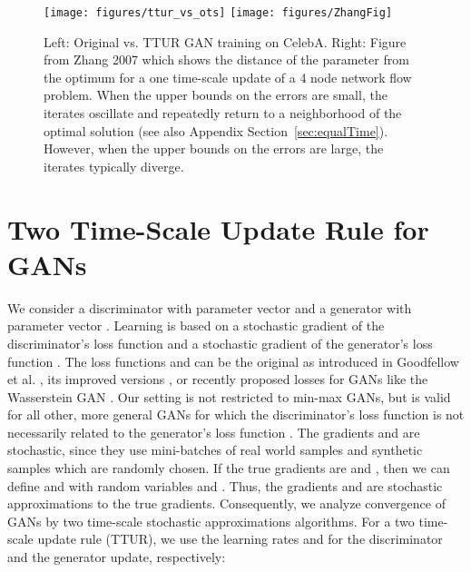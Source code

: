 \documentclass{article}
\begin{document}
\begin{figure} \centering
\texttt{[image: figures/ttur\_vs\_ots]}
\texttt{[image: figures/ZhangFig]}
\caption[Oscillation in GAN training]{Left: Original vs. TTUR GAN training on
CelebA. Right: Figure from Zhang 2007 \cite{Zhang:07} which shows the distance
of the parameter from the optimum for a one time-scale update
of a 4 node network flow problem.
When the upper bounds on the errors  are small,
the iterates oscillate and repeatedly return to a neighborhood of the optimal
solution (see also Appendix
Section~\ref{sec:equalTime}).
However, when the upper bounds on the errors are large, the iterates
typically diverge.
\label{fig:tturvsorig}}
\end{figure}

\section*{Two Time-Scale Update Rule for GANs}
\label{sec:TTUR}

We consider a
discriminator  with parameter vector 
and a generator  with parameter vector .
Learning is based on a
stochastic gradient 
of the discriminator's loss function 
and a stochastic gradient  of the generator's loss function .
The loss functions  and 
can be the original as introduced in Goodfellow et al. \cite{Goodfellow:14nips},
its improved versions \cite{Goodfellow:17tutorial}, or recently proposed losses for GANs like the
Wasserstein GAN \cite{Arjovsky:17}. Our setting is not restricted to min-max
GANs, but is valid for all other, more general GANs for which the
discriminator's loss function  is not necessarily related to the
generator's loss function .
The gradients
 and 
are stochastic, since they use mini-batches of  real world samples
 and  synthetic samples  which are randomly chosen.
If the true gradients are  and
, then we can define
 and
 with random
variables  and .
Thus, the gradients
 and 
are stochastic approximations to the true gradients.
Consequently, we analyze convergence of GANs
by two time-scale stochastic approximations algorithms.
For a two time-scale update rule (TTUR),
we use the learning rates  and  for the discriminator and
the generator update, respectively:
\end{document}
